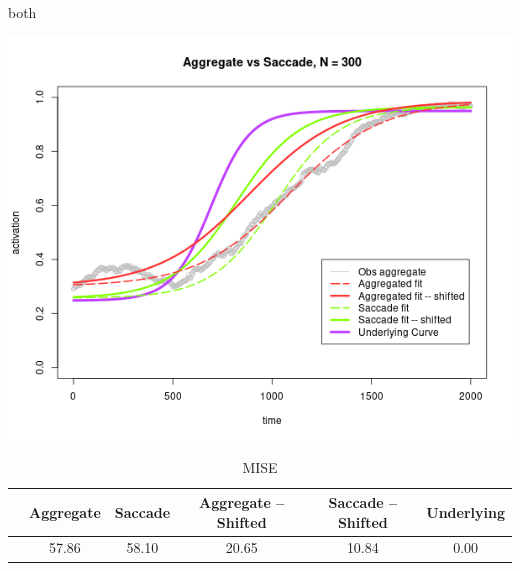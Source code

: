 \documentclass{beamer}
\begin{document}
\begin{frame}{both}
\begin{center}
\includegraphics[scale=0.35]{img/reg_fit.png}
\end{center}
{\scriptsize
\begin{table}[H]
\captionsetup{font=scriptsize}
\caption*{MISE}
\centering
\begin{tabular}{cccccc}
  \hline
 & Aggregate & Saccade & Aggregate -- Shifted & Saccade -- Shifted & Underlying \\ 
  \hline
 & 57.86 & 58.10 & 20.65 & 10.84 & 0.00 \\ 
   \hline
\end{tabular}
\end{table}
}
\end{frame}
\end{document}
